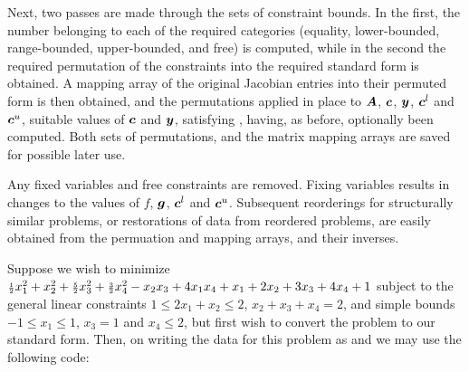 \documentclass{galahad}
\begin{document}
Next, two passes are made through the sets of constraint bounds. 
In the first, the number belonging to each of the required categories 
(equality, lower-bounded, range-bounded, 
upper-bounded, and free) is computed, while in the 
second the required permutation of the constraints 
into the required standard form is obtained. 
A mapping array of the original Jacobian entries into their 
permuted form is then obtained, and the permutations applied in place 
to ${\bm{A}}$, ${\bm{c}}$, ${\bm{y}}$, ${\bm{c}}^l$ and ${\bm{c}}^u$, 
suitable values of ${\bm{c}}$ and ${\bm{y}}$, satisfying ,
having, as before, optionally been computed. 
Both sets of permutations, and the matrix mapping arrays are saved for 
possible later use. 
 
Any fixed variables and free constraints are removed. Fixing variables 
results in changes to the values of $f$, ${\bm{g}}$, ${\bm{c}}^l$ and ${\bm{c}}^u$. 
Subsequent reorderings for structurally similar problems, or restorations 
of data from reordered problems, 
are easily obtained from the permuation and mapping arrays, and their inverses. 


\galexample
Suppose we wish to minimize
${\scriptstyle \frac{1}{2}} x_1^2 + x_2^2 + {\scriptstyle \frac{5}{2}} x_3^2 + 
{\scriptstyle \frac{3}{2}} x_4^2 - x_2 x_3 + 4 x_1 x_4 
 + x_1 + 2 x_2 + 3 x_3 + 4 x_4 + 1$ 
subject to the general linear constraints 
$1 \leq 2 x_1 + x_2 \leq 2$, 
$x_2 + x_3 + x_4 = 2$, and simple bounds 
$-1 \leq x_1 \leq 1$, $x_3 = 1$ and $x_4 \leq 2$, but first wish to 
convert the problem to our standard form. 
Then, on writing the data for this problem as 
and
we may use the following code:
\end{document}
